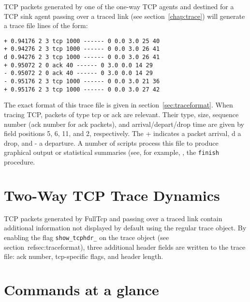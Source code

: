 TCP packets generated by one of the one-way TCP agents and destined for
a TCP sink agent
passing over a traced link (see section~\ref{chap:trace})
will generate a trace file lines of the form:
\begin{verbatim}
+ 0.94176 2 3 tcp 1000 ------ 0 0.0 3.0 25 40
+ 0.94276 2 3 tcp 1000 ------ 0 0.0 3.0 26 41
d 0.94276 2 3 tcp 1000 ------ 0 0.0 3.0 26 41
+ 0.95072 2 0 ack 40 ------ 0 3.0 0.0 14 29
- 0.95072 2 0 ack 40 ------ 0 3.0 0.0 14 29
- 0.95176 2 3 tcp 1000 ------ 0 0.0 3.0 21 36
+ 0.95176 2 3 tcp 1000 ------ 0 0.0 3.0 27 42
\end{verbatim}
The exact format of this trace file is given in section~\ref{sec:traceformat}.
When tracing TCP, packets of type {\sf tcp} or {\sf ack} are relevant.
Their type, size, sequence number (ack number for ack packets),
and arrival/depart/drop time are given by field positions
5, 6, 11, and 2, respectively.
The {\sf +} indicates a packet arrival, {\sf d} a drop, and {\sf -} a
departure.
A number of scripts process this file to produce graphical output or
statistical summaries (see,  for example, , the
{\tt finish} procedure.

\section{Two-Way TCP Trace Dynamics}
\label{sec:tcpdyn}

TCP packets generated by FullTcp and
passing over a traced link contain additional information not displayed
by default using the regular trace object.
By enabling the flag {\tt show\_tcphdr\_} on the trace object
(see section~ref{sec:traceformat}), three additional header fields are
written to the trace file: ack number, tcp-specific flags, and header length.


\section{Commands at a glance}
\label{sec:tcpcommand}

